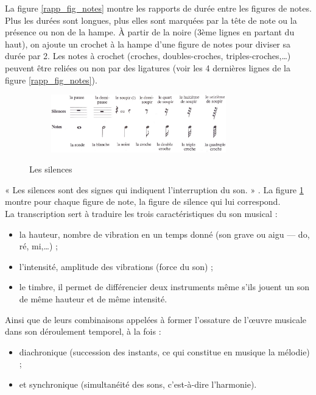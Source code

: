 La figure \ref{rapp_fig_notes} montre les rapports de durée entre les figures
de notes. Plus les durées sont longues, plus elles sont marquées par la tête de
note ou la présence ou non de la hampe. À partir de la noire (3ème lignes en
partant du haut), on ajoute un crochet à la hampe d’une figure de notes pour
diviser sa durée par 2. 
Les notes à crochet (croches, doubles-croches, triples-croches,…) 
peuvent être reliées ou non par des ligatures (voir les 4 dernières lignes de
la figure \ref{rapp_fig_notes}).\newpage
\begin{figure}[h]
	\centering
	\includegraphics[height=25mm, width=95mm]{
    z_images/3_methodes/0_notation_de_la_batterie/4_silences.png}
	\caption{Les silences}\cite{danhauser}

	\label{silences}
\end{figure}
« Les silences sont des signes qui indiquent l’interruption du son. »
\cite{danhauser}. La figure \ref{silences} montre pour chaque figure de note,
la figure de silence qui lui correspond.\\

La transcription sert à traduire les trois caractéristiques du son musical :
\begin{itemize}
	\item la hauteur, nombre de vibration en un temps donné (son grave ou
        aigu — do, ré, mi,…) ;
	\item l’intensité, amplitude des vibrations (force du son) ;
	\item le timbre, il permet de différencier deux instruments même s’ils
        jouent un son de même hauteur et de même intensité.
\end{itemize}

Ainsi que de leurs combinaisons appelées à former l’ossature de l’œuvre
musicale dans son déroulement temporel, à la fois :
\begin{itemize}
	\item diachronique (succession des instants, ce qui constitue en musique la
        mélodie) ;
	\item et synchronique (simultanéité des sons, c’est-à-dire l’harmonie).
\end{itemize}
